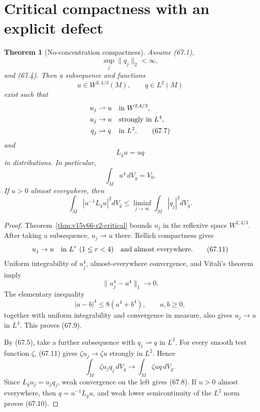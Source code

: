 \documentclass[11pt]{article}
\newtheorem{theorem}{Theorem}[section]
\theoremstyle{remark}
\begin{document}
\section{Critical compactness with an explicit defect}

\begin{theorem}[No-concentration compactness]
\label{thm:v15v67-critical-compactness}
Assume (67.1),
\[
 \sup_j\|q_j\|_2<\infty,                              \tag{67.5}
\]
and (67.4).  Then a subsequence and functions
\[
 u\in W^{2,4/3}(M),\qquad q\in L^2(M)                 \tag{67.6}
\]
exist such that
\[
\begin{aligned}
 u_j&\rightharpoonup u &&\hbox{in }W^{2,4/3},\\
 u_j&\to u &&\hbox{strongly in }L^4,\\
 q_j&\rightharpoonup q &&\hbox{in }L^2,               \tag{67.7}
\end{aligned}
\]
and
\[
 L_{\bar g}u=uq                                       \tag{67.8}
\]
in distributions.  In particular,
\[
 \int_Mu^4\,dV_{\bar g}=V_0.                          \tag{67.9}
\]
If \(u>0\) almost everywhere, then
\[
 \int_M|u^{-1}L_{\bar g}u|^2dV_{\bar g}
 \leq\liminf_{j\to\infty}
 \int_M|q_j|^2dV_{\bar g}.                            \tag{67.10}
\]
\end{theorem}

\begin{proof}
Theorem~\ref{thm:v15v66-r2-critical} bounds \(u_j\) in the
reflexive space \(W^{2,4/3}\).  After taking a subsequence,
\(u_j\rightharpoonup u\) there.  Rellich compactness gives
\[
 u_j\to u\quad\hbox{in }L^r\ (1\leq r<4)
 \quad\hbox{and almost everywhere}.                   \tag{67.11}
\]
Uniform integrability of \(u_j^4\), almost-everywhere convergence,
and Vitali's theorem imply
\[
 \|u_j^4-u^4\|_1\to0.
\]
The elementary inequality
\[
 |a-b|^4\leq 8(a^4+b^4),\qquad a,b\geq0,
\]
together with uniform integrability and convergence in measure,
also gives \(u_j\to u\) in \(L^4\).  This proves (67.9).

By (67.5), take a further subsequence with
\(q_j\rightharpoonup q\) in \(L^2\).  For every smooth test
function \(\zeta\), (67.11) gives
\(\zeta u_j\to\zeta u\) strongly in \(L^2\).  Hence
\[
 \int_M\zeta u_jq_j\,dV_{\bar g}
 \longrightarrow
 \int_M\zeta uq\,dV_{\bar g}.                         \tag{67.12}
\]
Since \(L_{\bar g}u_j=u_jq_j\), weak convergence on the left
gives (67.8).  If \(u>0\) almost everywhere, then
\(q=u^{-1}L_{\bar g}u\), and weak lower semicontinuity of the
\(L^2\) norm proves (67.10).
\end{proof}
\end{document}
